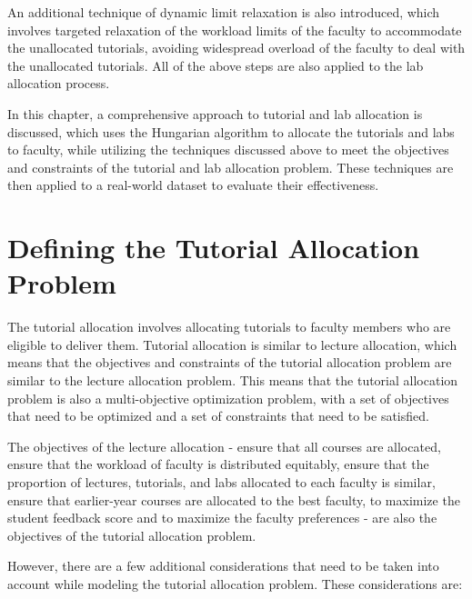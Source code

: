 An additional technique of dynamic limit relaxation is also introduced, which involves targeted relaxation of the workload limits of the faculty to accommodate the unallocated tutorials, avoiding widespread overload of the faculty to deal with the unallocated tutorials. All of the above steps are also applied to the lab allocation process.

In this chapter, a comprehensive approach to tutorial and lab allocation is discussed, which uses the Hungarian algorithm to allocate the tutorials and labs to faculty, while utilizing the techniques discussed above to meet the objectives and constraints of the tutorial and lab allocation problem. These techniques are then applied to a real-world dataset to evaluate their effectiveness.

\section{Defining the Tutorial Allocation Problem}

The tutorial allocation involves allocating tutorials to faculty members who are eligible to deliver them. Tutorial allocation is similar to lecture allocation, which means that the objectives and constraints of the tutorial allocation problem are similar to the lecture allocation problem. This means that the tutorial allocation problem is also a multi-objective optimization problem, with a set of objectives that need to be optimized and a set of constraints that need to be satisfied.

The objectives of the lecture allocation - ensure that all courses are allocated, ensure that the workload of faculty is distributed equitably, ensure that the proportion of lectures, tutorials, and labs allocated to each faculty is similar, ensure that earlier-year courses are allocated to the best faculty, to maximize the student feedback score and to maximize the faculty preferences - are also the objectives of the tutorial allocation problem.

However, there are a few additional considerations that need to be taken into account while modeling the tutorial allocation problem. These considerations are:

